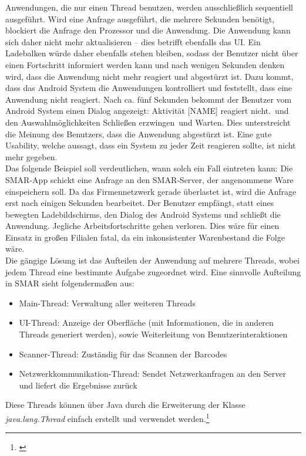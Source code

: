 Anwendungen, die nur einen Thread benutzen, werden ausschließlich sequentiell ausgeführt. Wird eine Anfrage ausgeführt, die mehrere Sekunden benötigt, blockiert die Anfrage den Prozessor und die Anwendung. Die Anwendung kann sich daher nicht mehr aktualisieren -- dies betrifft ebenfalls das \ac{UI}. Ein Ladebalken würde daher ebenfalls stehen bleiben, sodass der Benutzer nicht über einen Fortschritt informiert werden kann und nach wenigen Sekunden denken wird, dass die Anwendung nicht mehr reagiert und abgestürzt ist. Dazu kommt, dass das Android System die Anwendungen kontrolliert und feststellt, dass eine Anwendung nicht reagiert. Nach ca. fünf Sekunden bekommt der Benutzer vom Android System einen Dialog angezeigt: \glqq Aktivität [NAME] reagiert nicht.\grqq\ und den Auswahlmöglichkeiten \glqq Schließen erzwingen\grqq\ und \glqq Warten\grqq . Dies unterstreicht die Meinung des Benutzers, dass die Anwendung abgestürzt ist. Eine gute Usability, welche aussagt, dass ein System zu jeder Zeit reagieren sollte, ist nicht mehr gegeben.\\

Das folgende Beispiel soll verdeutlichen, wann solch ein Fall eintreten kann: Die \ac{SMAR}-App schickt eine Anfrage an den \ac{SMAR}-Server, der angenommene Ware einspeichern soll. Da das Firmennetzwerk gerade überlastet ist, wird die Anfrage erst nach einigen Sekunden bearbeitet. Der Benutzer empfängt, statt eines bewegten Ladebildschirms, den Dialog des Android Systems und schließt die Anwendung. Jegliche Arbeitsfortschritte gehen verloren. Dies wäre für einen Einsatz in großen Filialen fatal, da ein inkonsistenter Warenbestand die Folge wäre.\\

Die gängige Lösung ist das Aufteilen der Anwendung auf mehrere Threads, wobei jedem Thread eine bestimmte Aufgabe zugeordnet wird. Eine sinnvolle Aufteilung in \ac{SMAR} sieht folgendermaßen aus:
\begin{itemize}
	\item Main-Thread: Verwaltung aller weiteren Threads
	\item UI-Thread: Anzeige der Oberfläche (mit Informationen, die in anderen Threads generiert werden), sowie Weiterleitung von Benutzerinteraktionen
	\item Scanner-Thread: Zuständig für das Scannen der Barcodes
	\item Netzwerkkommunikation-Thread: Sendet Netzwerkanfragen an den Server und liefert die Ergebnisse zurück
\end{itemize}
Diese Threads können über Java durch die Erweiterung der Klasse \textit{java.lang.Thread} einfach erstellt und verwendet werden.\footnote{\citep[S. 18ff.]{java_threads}}\\

